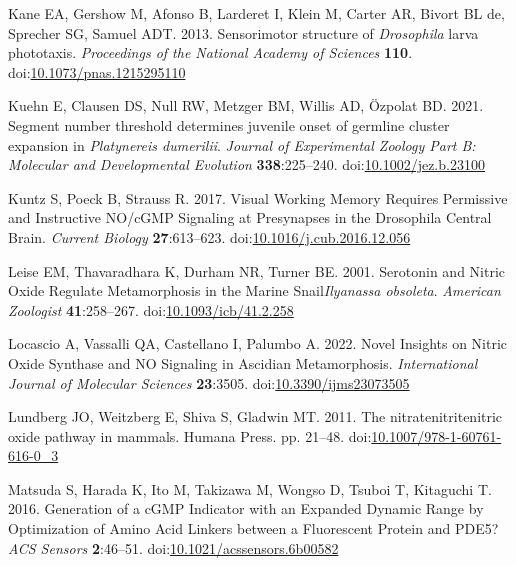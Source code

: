 \documentclass[
  10pt,
  onecolumn]{article}
\newlength{\cslhangindent}
\newlength{\cslentryspacingunit} %
\newenvironment{CSLReferences}[2] %
 {%
  \setlength{\parindent}{0pt}
  \ifodd #1
  \let\oldpar\par
  \def\par{\hangindent=\cslhangindent\oldpar}
  \fi
  \setlength{\parskip}{#2\cslentryspacingunit}
 }%
 {}
\begin{document}
\begin{CSLReferences}{1}{0}
\leavevmode{}%
Kane EA, Gershow M, Afonso B, Larderet I, Klein M, Carter AR, Bivort BL
de, Sprecher SG, Samuel ADT. 2013. Sensorimotor structure of
{\emph{Drosophila}} larva phototaxis. \emph{Proceedings of the National
Academy of Sciences} \textbf{110}.
doi:\href{https://doi.org/10.1073/pnas.1215295110}{10.1073/pnas.1215295110}

\leavevmode{}%
Kuehn E, Clausen DS, Null RW, Metzger BM, Willis AD, Özpolat BD. 2021.
Segment number threshold determines juvenile onset of germline cluster
expansion in {\emph{Platynereis dumerilii}}. \emph{Journal of
Experimental Zoology Part B: Molecular and Developmental Evolution}
\textbf{338}:225--240.
doi:\href{https://doi.org/10.1002/jez.b.23100}{10.1002/jez.b.23100}

\leavevmode{}%
Kuntz S, Poeck B, Strauss R. 2017. Visual Working Memory Requires
Permissive and Instructive NO/cGMP Signaling at Presynapses in the
Drosophila Central Brain. \emph{Current Biology} \textbf{27}:613--623.
doi:\href{https://doi.org/10.1016/j.cub.2016.12.056}{10.1016/j.cub.2016.12.056}

\leavevmode{}%
Leise EM, Thavaradhara K, Durham NR, Turner BE. 2001. Serotonin and
Nitric Oxide Regulate Metamorphosis in the Marine Snail{\emph{Ilyanassa
obsoleta}}. \emph{American Zoologist} \textbf{41}:258--267.
doi:\href{https://doi.org/10.1093/icb/41.2.258}{10.1093/icb/41.2.258}

\leavevmode{}%
Locascio A, Vassalli QA, Castellano I, Palumbo A. 2022. Novel Insights
on Nitric Oxide Synthase and NO Signaling in Ascidian Metamorphosis.
\emph{International Journal of Molecular Sciences} \textbf{23}:3505.
doi:\href{https://doi.org/10.3390/ijms23073505}{10.3390/ijms23073505}

\leavevmode{}%
Lundberg JO, Weitzberg E, Shiva S, Gladwin MT. 2011. The
nitrate{\textendash}nitrite{\textendash}nitric oxide pathway in mammals.
Humana Press. pp. 21--48.
doi:\href{https://doi.org/10.1007/978-1-60761-616-0_3}{10.1007/978-1-60761-616-0\_3}

\leavevmode{}%
Matsuda S, Harada K, Ito M, Takizawa M, Wongso D, Tsuboi T, Kitaguchi T.
2016. Generation of a cGMP Indicator with an Expanded Dynamic Range by
Optimization of Amino Acid Linkers between a Fluorescent Protein and
PDE5? \emph{ACS Sensors} \textbf{2}:46--51.
doi:\href{https://doi.org/10.1021/acssensors.6b00582}{10.1021/acssensors.6b00582}


\end{CSLReferences}
\end{document}
